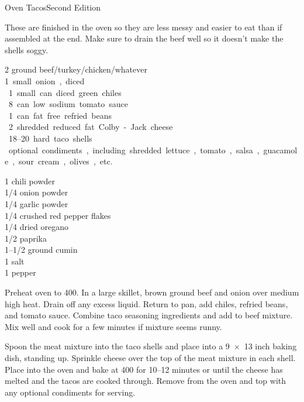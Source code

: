 \begin{entry}{Oven Tacos}{Second Edition}

\begin{open}
These are finished in the oven so they are less messy and easier to eat than if assembled at the end. Make sure to drain the beef well so it doesn't make the shells soggy.
\end{open}
\begin{ingredients}
  \SI{2}{\pound} ground beef/turkey/chicken/whatever\\
  \SI{1} small onion, diced\\
  \SI{1} small can diced green chiles\\
  \SI{8}{\ounce} can low sodium tomato sauce \\
  \SI{1}{\pound} can fat free refried beans \\
  \SI{2}{\cup} shredded reduced fat Colby-Jack cheese\\
  \numrange{18}{20} hard taco shells\\
  optional condiments, including shredded lettuce, tomato, salsa, guacamole, sour cream, olives, etc.
\end{ingredients}
\begin{ingredients}
  \SI{1}{\tblspoon} chili powder\\
  \SI{1/4}{\teaspoon} onion powder\\
  \SI{1/4}{\teaspoon} garlic powder\\
  \SI{1/4}{\teaspoon} crushed red pepper flakes\\
  \SI{1/4}{\teaspoon} dried oregano\\
  \SI{1/2}{\teaspoon} paprika\\
  \SIrange{1}{1/2}{\teaspoon} ground cumin\\
  \SI{1}{\teaspoon} salt\\
\SI{1}{\teaspoon} pepper\\
\end{ingredients}

Preheat oven to \SI{400}{\degreeF}. In a large skillet, brown ground beef and onion over medium high heat. Drain off any excess liquid. Return to pan, add chiles, refried beans, and tomato sauce. Combine taco seasoning ingredients and add to beef mixture. Mix well and cook for a few minutes if mixture seems runny.

Spoon the meat mixture into the taco shells and place into a \num{9x13} inch baking dish, standing up. Sprinkle cheese over the top of the meat mixture in each shell. Place into the oven and bake at \SI{400}{\degreeF} for \numrange{10}{12} minutes or until the cheese has melted and the tacos are cooked through. Remove from the oven and top with any optional condiments for serving.

\end{entry}

